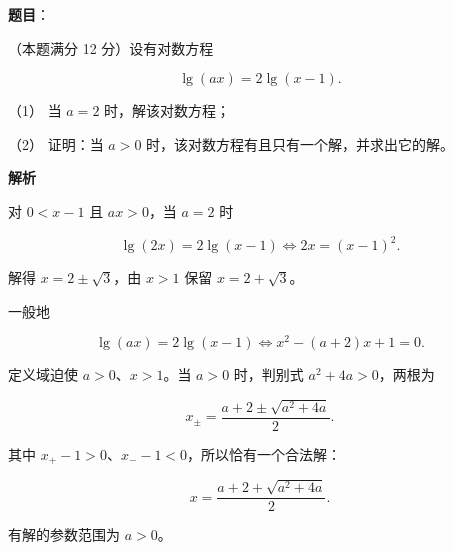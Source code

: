 \begin{answer}

\textbf{题目}：

（本题满分 12 分）设有对数方程

\nopagebreak[4]
\[
\lg(ax)=2\lg(x-1).
\]

（1） 当 $a=2$ 时，解该对数方程；

（2） 证明：当 $a>0$ 时，该对数方程有且只有一个解，并求出它的解。

\textbf{解析}


对 $0<x-1$ 且 $ax>0$，当 $a=2$ 时

\nopagebreak[4]
\[
\lg(2x)=2\lg(x-1)
\Longleftrightarrow
2x=(x-1)^2.
\]

解得 $x=2\pm\sqrt3$，由 $x>1$ 保留 $x=2+\sqrt3$。


一般地

\nopagebreak[4]
\[
\lg(ax)=2\lg(x-1)
\Longleftrightarrow
x^2-(a+2)x+1=0.
\]

定义域迫使 $a>0$、$x>1$。当 $a>0$ 时，判别式 $a^2+4a>0$，两根为

\nopagebreak[4]
\[
x_\pm=\frac{a+2\pm\sqrt{a^2+4a}}2.
\]

其中 $x_+-1>0$、$x_--1<0$，所以恰有一个合法解：

\nopagebreak[4]
\[
x=\frac{a+2+\sqrt{a^2+4a}}2.
\]

有解的参数范围为 $a>0$。



\end{answer}
